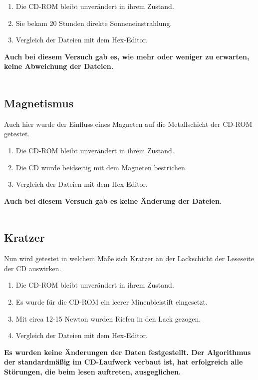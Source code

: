 \documentclass[10pt,a4paper]{article} %
\begin{document}
\begin{enumerate}
\item Die CD-ROM bleibt unverändert in ihrem Zustand.
\item  Sie bekam 20 Stunden direkte Sonneneinstrahlung.
\item Vergleich der Dateien mit dem Hex-Editor. 
\end{enumerate}

\textbf{Auch bei diesem Versuch gab es, wie mehr oder weniger zu erwarten, keine Abweichung der Dateien.}\\\\

\subsection{Magnetismus}
Auch hier wurde der Einfluss eines Magneten auf die Metallschicht der CD-ROM getestet. 
\begin{enumerate}
\item Die CD-ROM bleibt unverändert in ihrem Zustand.
\item Die CD wurde beidseitig mit dem Magneten bestrichen.
\item Vergleich der Dateien mit dem Hex-Editor. 
\end{enumerate}

\textbf{Auch bei diesem Versuch gab es keine Änderung der Dateien.}\\\\

\subsection{Kratzer}
Nun wird getestet in welchem Maße sich Kratzer an der Lackschicht der Leseseite der CD auswirken.

\begin{enumerate}
\item Die CD-ROM bleibt unverändert in ihrem Zustand.
\item Es wurde für die CD-ROM ein leerer Minenbleistift eingesetzt.
\item Mit circa 12-15 Newton wurden Riefen in den Lack gezogen.
\item Vergleich der Dateien mit dem Hex-Editor. 
\end{enumerate}

\textbf{Es wurden keine Änderungen der Daten festgestellt. Der Algorithmus der standardmäßig im CD-Laufwerk verbaut ist, hat erfolgreich alle Störungen, die beim lesen auftreten, ausgeglichen.}\\\\
\end{document}
